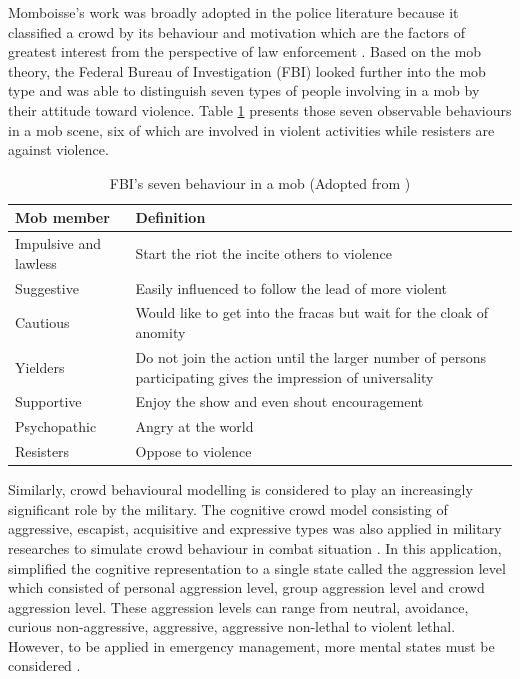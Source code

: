 Momboisse’s work was broadly adopted in the police literature because it classified a crowd by its behaviour and motivation which are the factors of greatest interest from the perspective of law enforcement \parencite{FBI1967}. Based on the mob theory, the Federal Bureau of Investigation (FBI) looked further into the mob type and was able to distinguish seven types of people involving in a mob by their attitude toward violence. Table \ref{table:fbiMobBehavior} presents those seven observable behaviours in a mob scene, six of which are involved in violent activities while resisters are against violence.

\begin{table}
	\caption{FBI's seven behaviour in a mob (Adopted from \textcite{FBI1967})}
	\label{table:fbiMobBehavior}
	\centering
	\begin{tabular}{|l|p{10cm}|}
		\hline
		\textbf{Mob member} & \textbf{Definition} \\ \hline \hline
		Impulsive and lawless & Start the riot the incite others to violence \\ \hline
		Suggestive &  Easily influenced to follow the lead of more violent \\ \hline
		Cautious & Would like to get into the fracas but wait for the cloak of anomity \\ \hline
		Yielders & Do not join the action until the larger number of persons participating gives the impression of universality \\ \hline
		Supportive & Enjoy the show and even shout encouragement \\ \hline
		Psychopathic & Angry at the world \\ \hline
		Resisters & Oppose to violence \\ \hline
	\end{tabular}
\end{table}

Similarly, crowd behavioural modelling is considered to play an increasingly significant role by the military. The cognitive crowd model consisting of aggressive, escapist, acquisitive and expressive types was also applied in military researches to simulate crowd behaviour in combat situation \parencite{Petty2004}. In this application, \textcite{Nguyen2005} simplified the cognitive representation to a single state called the aggression level which consisted of personal aggression level, group aggression level and crowd aggression level. These aggression levels can range from neutral, avoidance, curious non-aggressive, aggressive, aggressive non-lethal to violent lethal. However, to be applied in emergency management, more mental states must be considered \parencite{Zhou2010}.

